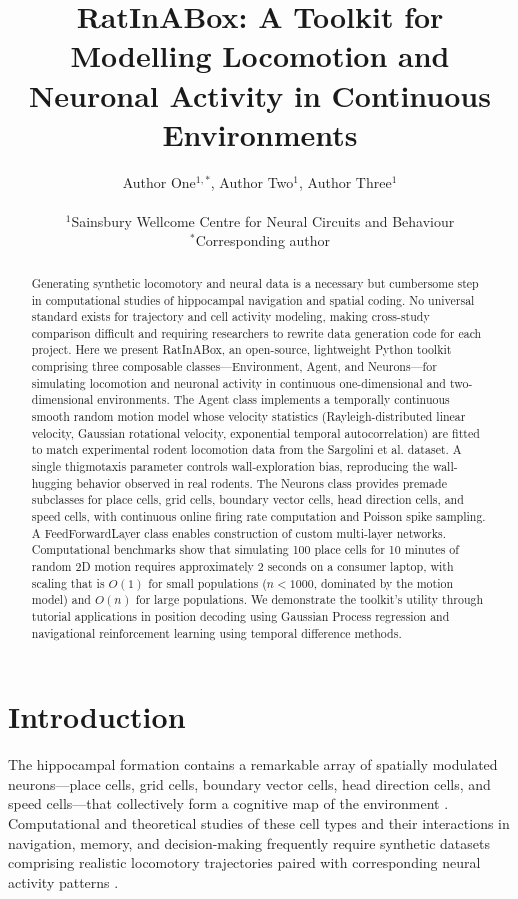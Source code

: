 \documentclass[12pt]{article}
\title{RatInABox: A Toolkit for Modelling Locomotion and Neuronal Activity in Continuous Environments}
\author{Author One$^{1,*}$, Author Two$^{1}$, Author Three$^{1}$\\
\\
\small $^{1}$Sainsbury Wellcome Centre for Neural Circuits and Behaviour\\
\small $^{*}$Corresponding author}
\date{}
\begin{document}
\maketitle

\begin{abstract}
Generating synthetic locomotory and neural data is a necessary but cumbersome step in computational studies of hippocampal navigation and spatial coding. No universal standard exists for trajectory and cell activity modeling, making cross-study comparison difficult and requiring researchers to rewrite data generation code for each project. Here we present RatInABox, an open-source, lightweight Python toolkit comprising three composable classes---Environment, Agent, and Neurons---for simulating locomotion and neuronal activity in continuous one-dimensional and two-dimensional environments. The Agent class implements a temporally continuous smooth random motion model whose velocity statistics (Rayleigh-distributed linear velocity, Gaussian rotational velocity, exponential temporal autocorrelation) are fitted to match experimental rodent locomotion data from the Sargolini et al. dataset. A single thigmotaxis parameter controls wall-exploration bias, reproducing the wall-hugging behavior observed in real rodents. The Neurons class provides premade subclasses for place cells, grid cells, boundary vector cells, head direction cells, and speed cells, with continuous online firing rate computation and Poisson spike sampling. A FeedForwardLayer class enables construction of custom multi-layer networks. Computational benchmarks show that simulating 100 place cells for 10 minutes of random 2D motion requires approximately 2 seconds on a consumer laptop, with scaling that is $O(1)$ for small populations ($n < 1000$, dominated by the motion model) and $O(n)$ for large populations. We demonstrate the toolkit's utility through tutorial applications in position decoding using Gaussian Process regression and navigational reinforcement learning using temporal difference methods.
\end{abstract}

\section{Introduction}

The hippocampal formation contains a remarkable array of spatially modulated neurons---place cells, grid cells, boundary vector cells, head direction cells, and speed cells---that collectively form a cognitive map of the environment \citep{okeefe1978hippocampus,moser2008place,hafting2005microstructure}. Computational and theoretical studies of these cell types and their interactions in navigation, memory, and decision-making frequently require synthetic datasets comprising realistic locomotory trajectories paired with corresponding neural activity patterns \citep{banino2018vector,whittington2020tolman}.
\end{document}
